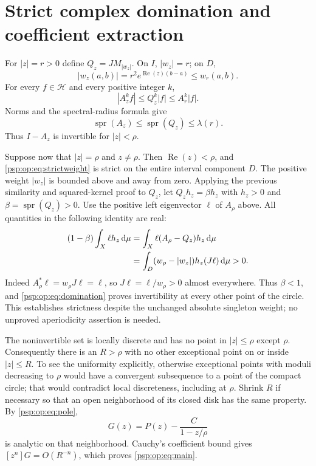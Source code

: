 \documentclass[11pt,letterpaper]{article}
\numberwithin{equation}{section}
\theoremstyle{remark}\newtheorem{remark}[theorem]{Remark}
\newcommand{\dd}{\,\mathrm d}
\newcommand{\spr}{\operatorname{spr}}
\begin{document}
\section{Strict complex domination and coefficient extraction}\label{psp:op:sec:circle}
For $|z|=r>0$ define $Q_z=JM_{|w_z|}$. On $I$, $|w_z|=r$;
on $D$,
\begin{equation}\label{psp:op:eq:strictweight}
 |w_z(a,b)|=r^2e^{\operatorname{Re}(z)(b-a)}\leq w_r(a,b).
\end{equation}
For every $f\in\mathcal H$ and every positive integer $k$,
\[
 |A_z^kf|\leq Q_z^k|f|\leq A_r^k|f|.
\]
Norms and the spectral-radius formula give
\begin{equation}\label{psp:op:eq:domination}
 \spr(A_z)\leq\spr(Q_z)\leq\lambda(r).
\end{equation}
Thus $I-A_z$ is invertible for $|z|<\rho$.

Suppose now that $|z|=\rho$ and $z\ne\rho$.
Then $\operatorname{Re}(z)<\rho$, and \eqref{psp:op:eq:strictweight} is
strict on the entire interval component $D$. The positive weight
$|w_z|$ is bounded above and away from zero. Applying the previous
similarity and squared-kernel proof to $Q_z$, let
$Q_zh_z=\beta h_z$ with $h_z>0$ and $\beta=\spr(Q_z)>0$.
Use the positive left eigenvector $\ell$ of $A_\rho$ above. All
quantities in the following identity are real:
\begin{align}
 (1-\beta)\int_X\ell h_z\dd\mu
 &=\int_X\ell(A_\rho-Q_z)h_z\dd\mu\notag\\
 &=\int_D(w_\rho-|w_z|)h_z(J\ell)\dd\mu>0.
 \label{psp:op:eq:strictdomination}
\end{align}
Indeed $A_\rho^*\ell=w_\rho J\ell=\ell$, so
$J\ell=\ell/w_\rho>0$ almost everywhere. Thus $\beta<1$, and
\eqref{psp:op:eq:domination} proves invertibility at every other point of
the circle. This establishes strictness despite the unchanged
absolute singleton weight; no unproved aperiodicity assertion is
needed.

The noninvertible set is locally discrete and has no point in
$|z|\leq\rho$ except $\rho$. Consequently there is an $R>\rho$
with no other exceptional point on or inside $|z|\leq R$.
To see the uniformity explicitly, otherwise exceptional points with
moduli decreasing to $\rho$ would have a convergent subsequence to
a point of the compact circle; that would contradict local
discreteness, including at $\rho$. Shrink $R$ if necessary so that
an open neighborhood of its closed disk has the same property.
By \eqref{psp:op:eq:pole},
\[
 G(z)=P(z)-\frac{C}{1-z/\rho}
\]
is analytic on that neighborhood. Cauchy's coefficient bound gives
$[z^n]G=O(R^{-n})$, which proves \eqref{psp:op:eq:main}.
\end{document}
